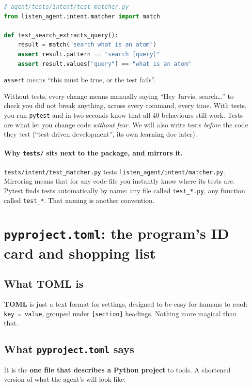 \documentclass[11pt,a4paper]{article}
\begin{document}
\begin{lstlisting}[language=Python]
# agent/tests/intent/test_matcher.py
from listen_agent.intent.matcher import match

def test_search_extracts_query():
    result = match("search what is an atom")
    assert result.pattern == "search {query}"
    assert result.values["query"] == "what is an atom"
\end{lstlisting}

\noindent \texttt{assert} means ``this must be true, or the test fails''.

\begin{why}
Without tests, every change means manually saying ``Hey Jarvis, search\ldots'' to check you
did not break anything, across every command, every time. With tests, you run
\texttt{pytest} and in two seconds know that all 40 behaviours still work. Tests are what let
you change code \emph{without fear}. We will also write tests \emph{before} the code they
test (``test-driven development'', its own learning doc later).
\end{why}

\paragraph{Why \texttt{tests/} sits next to the package, and mirrors it.}
\texttt{tests/intent/test\_matcher.py} tests \texttt{listen\_agent/intent/matcher.py}.
Mirroring means that for any code file you instantly know where its tests are. Pytest finds
tests automatically by name: any file called \texttt{test\_*.py}, any function called
\texttt{test\_*}. That naming is another convention.

\section{\texttt{pyproject.toml}: the program's ID card and shopping list}

\subsection{What TOML is}
\textbf{TOML} is just a text format for settings, designed to be easy for humans to read:
\texttt{key = value}, grouped under \texttt{[section]} headings. Nothing more magical than
that.

\subsection{What \texttt{pyproject.toml} says}
It is the \textbf{one file that describes a Python project} to tools. A shortened version of
what the agent's will look like:
\end{document}

